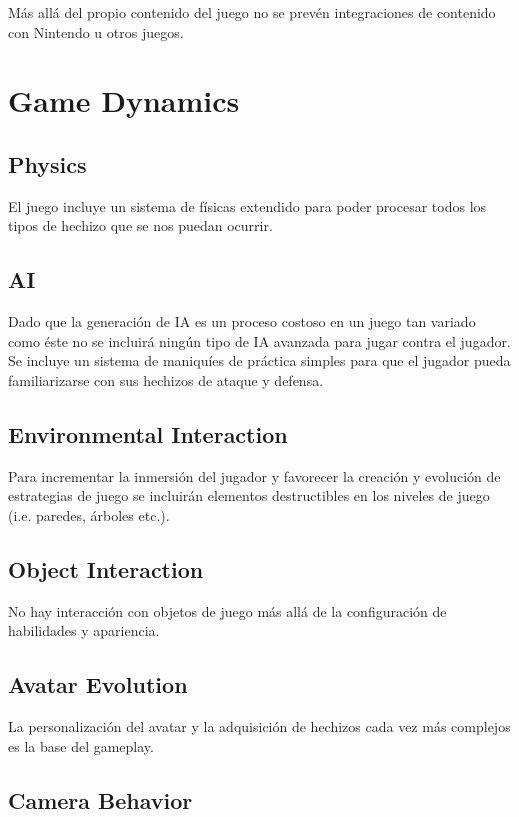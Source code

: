 \documentclass[12pt]{article}
\begin{document}
Más allá del propio contenido del juego no se prevén integraciones de contenido con Nintendo u otros juegos.

\newpage  

\section{Game Dynamics}

\subsection{Physics}

El juego incluye un sistema de físicas extendido para poder procesar todos los tipos de hechizo que se nos puedan ocurrir.

\subsection{AI}

Dado que la generación de IA es un proceso costoso en un juego tan variado como éste no se incluirá ningún tipo de IA avanzada para jugar contra el jugador. Se incluye un sistema de maniquíes de práctica simples para que el jugador pueda familiarizarse con sus hechizos de ataque y defensa.

\subsection{Environmental Interaction}

Para incrementar la inmersión del jugador y favorecer la creación y evolución de estrategias de juego se incluirán elementos destructibles en los niveles de juego (i.e. paredes, árboles etc.).

\subsection{Object Interaction}

No hay interacción con objetos de juego más allá de la configuración de habilidades y apariencia.

\subsection{Avatar Evolution}

La personalización del avatar y la adquisición de hechizos cada vez más complejos es la base del gameplay.     

\subsection{Camera Behavior}
\end{document}
